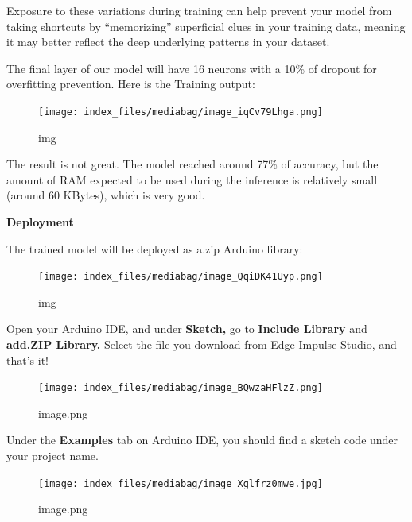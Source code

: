 \documentclass[
  letterpaper,
  DIV=11,
  numbers=noendperiod]{scrreprt}
\begin{document}
Exposure to these variations during training can help prevent your model
from taking shortcuts by ``memorizing'' superficial clues in your
training data, meaning it may better reflect the deep underlying
patterns in your dataset.

The final layer of our model will have 16 neurons with a 10\% of dropout
for overfitting prevention. Here is the Training output:

\begin{figure}[H]

{\centering \texttt{[image: index\_files/mediabag/image\_iqCv79Lhga.png]}

}

\caption{img}

\end{figure}

The result is not great. The model reached around 77\% of accuracy, but
the amount of RAM expected to be used during the inference is relatively
small (around 60 KBytes), which is very good.

\textbf{Deployment}

The trained model will be deployed as a.zip Arduino library:

\begin{figure}[H]

{\centering \texttt{[image: index\_files/mediabag/image\_QqiDK41Uyp.png]}

}

\caption{img}

\end{figure}

Open your Arduino IDE, and under \textbf{Sketch,} go to \textbf{Include
Library} and \textbf{add.ZIP Library.} Select the file you download from
Edge Impulse Studio, and that's it!

\begin{figure}[H]

{\centering \texttt{[image: index\_files/mediabag/image\_BQwzaHFlzZ.png]}

}

\caption{image.png}

\end{figure}

Under the \textbf{Examples} tab on Arduino IDE, you should find a sketch
code under your project name.

\begin{figure}[H]

{\centering \texttt{[image: index\_files/mediabag/image\_Xglfrz0mwe.jpg]}

}

\caption{image.png}

\end{figure}
\end{document}
